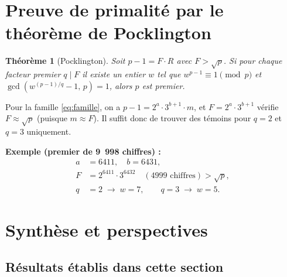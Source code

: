 \documentclass[12pt,a4paper]{article}
\newtheorem{theoreme}{Théorème}
\theoremstyle{definition}
\begin{document}
\section{Preuve de primalité par le théorème de Pocklington}

\begin{theoreme}[Pocklington]\label{thm:pocklington}
  Soit $p - 1 = F \cdot R$ avec $F > \sqrt{p}$.
  Si pour chaque facteur premier $q \mid F$
  il existe un entier $w$ tel que
  $w^{p-1} \equiv 1 \pmod{p}$ et
  $\gcd(w^{(p-1)/q} - 1,\, p) = 1$,
  alors $p$ est premier.
\end{theoreme}

Pour la famille \eqref{eq:famille}, on a
$p - 1 = 2^a \cdot 3^{b+1} \cdot m$,
et $F = 2^a \cdot 3^{b+1}$ vérifie $F \approx \sqrt{p}$
(puisque $m \approx F$).
Il suffit donc de trouver des témoins pour $q = 2$ et $q = 3$ uniquement.

\textbf{Exemple (premier de 9~998 chiffres) :}
\begin{align*}
  a &= 6411,\quad b = 6431,\\
  F &= 2^{6411} \cdot 3^{6432} \quad (4999 \text{ chiffres}) > \sqrt{p},\\
  q &= 2 \;\to\; w = 7, \qquad q = 3 \;\to\; w = 5.
\end{align*}

\section{Synthèse et perspectives}

\subsection{Résultats établis dans cette section}
\end{document}
